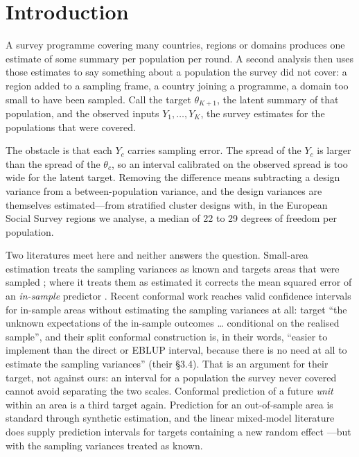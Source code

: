 \section{Introduction}

A survey programme covering many countries, regions or domains produces one
estimate of some summary per population per round. A second analysis then uses
those estimates to say something about a population the survey did not cover:
a region added to a sampling frame, a country joining a programme, a domain too
small to have been sampled. Call the target $\theta_{K+1}$, the latent summary of
that population, and the observed inputs $Y_1,\dots,Y_K$, the survey estimates
for the populations that were covered.

The obstacle is that each $Y_c$ carries sampling error. The spread of the $Y_c$
is larger than the spread of the $\theta_c$, so an interval calibrated on the
observed spread is too wide for the latent target. Removing the difference means
subtracting a design variance from a between-population variance, and the design
variances are themselves estimated---from stratified cluster designs with, in the
European Social Survey regions we analyse, a median of 22 to 29 degrees of
freedom per population.

Two literatures meet here and neither answers the question. Small-area
estimation treats the sampling variances as known and targets areas that were
sampled \citep{fay1979estimates,rao2015small}; where it treats them as estimated
it corrects the mean squared error of an \emph{in-sample} predictor
\citep{wang2003mse,rivest2003mse,you2006hierarchical,maiti2014,sugasawa2017}.
Recent conformal work reaches valid confidence intervals for in-sample areas
without estimating the sampling variances at all: \citet{zhang2026conformal}
target ``the unknown expectations of the in-sample outcomes \dots{} conditional
on the realised sample'', and their split conformal construction is, in their
words, ``easier to implement than the direct or EBLUP interval, because there is
no need at all to estimate the sampling variances'' (their \S3.4). That is an
argument for their target, not against ours: an interval for a population the
survey never covered cannot avoid separating the two scales. Conformal
prediction of a future \emph{unit} within an area \citep{bersson2024optimal} is
a third target again. Prediction for an out-of-sample area is standard
through synthetic estimation, and the linear mixed-model literature does supply
prediction intervals for targets containing a new random effect
\citep{chatterjee2008}---but with the sampling variances treated as known.

